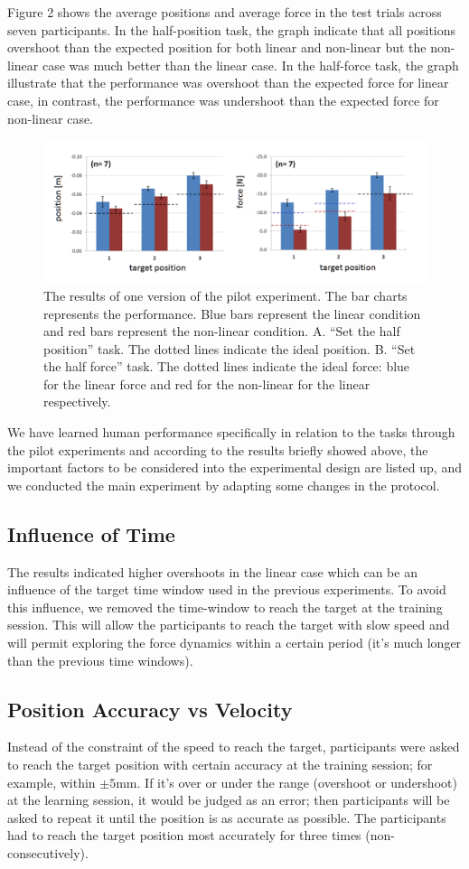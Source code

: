 Figure 2 shows the average positions and average force in the test trials across seven participants. In the half-position task, the graph indicate that all positions overshoot than the expected position for both linear and non-linear but the non-linear case was much better than the linear case. In the half-force task, the graph illustrate that the performance was overshoot than the expected force for linear case, in contrast, the performance was undershoot than the expected force for non-linear case.

\begin{figure}
	\centering
	\includegraphics[width=.7\textwidth]{Chie/figs/Figure2.png}
	\caption{The results of one version of the pilot experiment. The bar charts represents the performance. Blue bars represent the linear condition and red bars represent the non-linear condition. A. “Set the half position” task. The dotted lines indicate the ideal position. B. “Set the half force” task. The dotted lines indicate the ideal force: blue for the linear force and red for the non-linear for the linear respectively.}
	\label{pilot}
\end{figure}
We have learned human performance specifically in relation to the tasks through the pilot experiments and according to the results briefly showed above, the important factors to be considered into the experimental design are listed up, and we conducted the main experiment by adapting some changes in the protocol. 

\subsection{Influence of Time} 
The results indicated higher overshoots in the linear case which can be an influence of the target time window used in the previous experiments. To avoid this influence, we removed the time-window to reach the target at the training session. This will allow the participants to reach the target with slow speed and will permit exploring the force dynamics within a certain period (it’s much longer than the previous time windows).

\subsection{Position Accuracy vs Velocity} 
Instead of the constraint of the speed to reach the target, participants were asked to reach the target position with certain accuracy at the training session; for example, within $\pm 5$mm. If it’s over or under the range (overshoot or undershoot) at the learning session, it would be judged as an error; then participants will be asked to repeat it until the position is as accurate as possible. The participants had to reach the target position most accurately for three times (non-consecutively).

